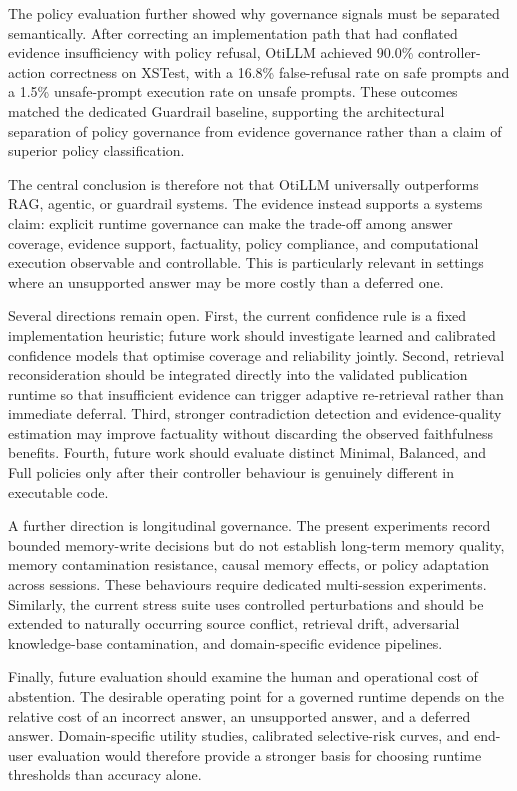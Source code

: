 \documentclass[manuscript, screen, review]{jair}
\begin{document}
The policy evaluation further showed why governance signals must be separated
semantically. After correcting an implementation path that had conflated
evidence insufficiency with policy refusal, OtiLLM achieved 90.0\% controller-action
correctness on XSTest, with a 16.8\% false-refusal rate on safe prompts and a
1.5\% unsafe-prompt execution rate on unsafe prompts. These outcomes matched the dedicated
Guardrail baseline, supporting the architectural separation of policy
governance from evidence governance rather than a claim of superior policy
classification.

The central conclusion is therefore not that OtiLLM universally outperforms
RAG, agentic, or guardrail systems. The evidence instead supports a systems
claim: explicit runtime governance can make the trade-off among answer
coverage, evidence support, factuality, policy compliance, and computational
execution observable and controllable. This is particularly relevant in
settings where an unsupported answer may be more costly than a deferred one.

Several directions remain open. First, the current confidence rule is a fixed
implementation heuristic; future work should investigate learned and calibrated
confidence models that optimise coverage and reliability jointly. Second,
retrieval reconsideration should be integrated directly into the validated
publication runtime so that insufficient evidence can trigger adaptive
re-retrieval rather than immediate deferral. Third, stronger contradiction
detection and evidence-quality estimation may improve factuality without
discarding the observed faithfulness benefits. Fourth, future work should
evaluate distinct Minimal, Balanced, and Full policies only after their
controller behaviour is genuinely different in executable code.

A further direction is longitudinal governance. The present experiments record
bounded memory-write decisions but do not establish long-term memory quality,
memory contamination resistance, causal memory effects, or policy adaptation
across sessions. These behaviours require dedicated multi-session experiments.
Similarly, the current stress suite uses controlled perturbations and should be
extended to naturally occurring source conflict, retrieval drift, adversarial
knowledge-base contamination, and domain-specific evidence pipelines.

Finally, future evaluation should examine the human and operational cost of
abstention. The desirable operating point for a governed runtime depends on the
relative cost of an incorrect answer, an unsupported answer, and a deferred
answer. Domain-specific utility studies, calibrated selective-risk curves, and
end-user evaluation would therefore provide a stronger basis for choosing
runtime thresholds than accuracy alone.
\end{document}
